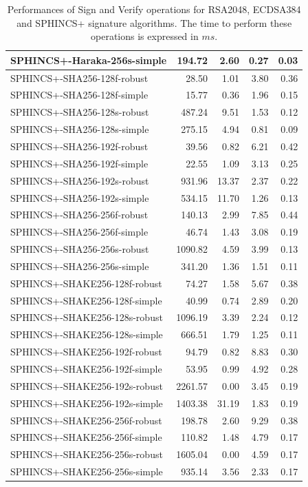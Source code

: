 \documentclass[a4paper,12pt]{article}
\begin{document}
\begin{table}[]
\begin{tabular}{@{}lrrrr@{}}
SPHINCS+-Haraka-256s-simple & 194.72 & 2.60   & 0.27 & 0.03 \\ \hline
SPHINCS+-SHA256-128f-robust & 28.50    & 1.01  & 3.80  & 0.36 \\
SPHINCS+-SHA256-128f-simple & 15.77   & 0.36  & 1.96 & 0.15 \\
SPHINCS+-SHA256-128s-robust & 487.24  & 9.51  & 1.53 & 0.12 \\
SPHINCS+-SHA256-128s-simple & 275.15  & 4.94  & 0.81 & 0.09 \\
SPHINCS+-SHA256-192f-robust & 39.56   & 0.82  & 6.21 & 0.42 \\
SPHINCS+-SHA256-192f-simple & 22.55   & 1.09  & 3.13 & 0.25 \\
SPHINCS+-SHA256-192s-robust & 931.96  & 13.37 & 2.37 & 0.22 \\
SPHINCS+-SHA256-192s-simple & 534.15  & 11.70  & 1.26 & 0.13 \\
SPHINCS+-SHA256-256f-robust & 140.13  & 2.99  & 7.85 & 0.44 \\
SPHINCS+-SHA256-256f-simple & 46.74   & 1.43  & 3.08 & 0.19 \\
SPHINCS+-SHA256-256s-robust & 1090.82 & 4.59  & 3.99 & 0.13 \\
SPHINCS+-SHA256-256s-simple & 341.20   & 1.36  & 1.51 & 0.11 \\ \hline
SPHINCS+-SHAKE256-128f-robust & 74.27   & 1.58  & 5.67 & 0.38 \\
SPHINCS+-SHAKE256-128f-simple & 40.99   & 0.74  & 2.89 & 0.20  \\
SPHINCS+-SHAKE256-128s-robust & 1096.19 & 3.39  & 2.24 & 0.12 \\
SPHINCS+-SHAKE256-128s-simple & 666.51  & 1.79  & 1.25 & 0.11 \\
SPHINCS+-SHAKE256-192f-robust & 94.79   & 0.82  & 8.83 & 0.30  \\
SPHINCS+-SHAKE256-192f-simple & 53.95   & 0.99  & 4.92 & 0.28 \\
SPHINCS+-SHAKE256-192s-robust & 2261.57 & 0.00     & 3.45 & 0.19 \\
SPHINCS+-SHAKE256-192s-simple & 1403.38 & 31.19 & 1.83 & 0.19 \\
SPHINCS+-SHAKE256-256f-robust & 198.78  & 2.60   & 9.29 & 0.38 \\
SPHINCS+-SHAKE256-256f-simple & 110.82  & 1.48  & 4.79 & 0.17 \\
SPHINCS+-SHAKE256-256s-robust & 1605.04 & 0.00     & 4.59 & 0.17 \\
SPHINCS+-SHAKE256-256s-simple & 935.14  & 3.56  & 2.33 & 0.17 \\ \bottomrule
\end{tabular}
\caption{Performances of Sign and Verify operations for RSA2048, ECDSA384 and SPHINCS+ signature algorithms. The time to perform these operations is expressed in $ms$.}
\label{tab:results_sig_liboqs}
\end{table}
\end{document}
